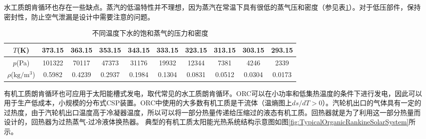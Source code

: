水工质朗肯循环也存在一些缺点。蒸汽的低温特性并不理想，因为蒸汽在常温下具有很低的蒸气压和密度（参见表\ref{tab:waterT_P_D}）。对于低压部件，保持密封性，防止空气泄漏是设计中需要注意的问题。
\begin{table}[htbp]
\setlength{\abovecaptionskip}{-10pt}
	\caption{不同温度下水的饱和蒸气的压力和密度}
	\begin{center}
	\begin{tabular}{cccccccccc}
		\toprule	
		    $T$(K)    &	373.15	    &    363.15    &    353.15    &    343.15    &    333.15    &    323.15    &    313.15    &    303.15    &    293.15\\
		\midrule	
		    $p$(Pa)    &    101322        &    70117    &    47373    &    31176    &    19932    &    12344    &    7381    &    4246    &    2339\\
		    $\rho$($\mathrm{kg/m^3}$)    &    0.5982        &    0.4239    &    0.2937    &    0.1984    &    0.1304    &    0.0831    &    0.0512    &    0.0304    &    0.0173\\
		\bottomrule
	\end{tabular}
	\end{center}
	\label{tab:waterT_P_D}
\end{table}

有机工质朗肯循环也可应用于太阳能槽式发电，取代常见的水工质朗肯循环。ORC可以在小功率和低集热温度的条件下进行发电，因此可以用于生产低成本，小规模的分布式CSP装置。ORC中使用的大多数有机工质是干流体（温熵图上$ds/dT > 0$）。汽轮机出口的气体具有一定的过热度，由于汽轮机出口温度高于冷凝器温度，所以可以将一部分热量传递给压缩过的液态有机工质。回热器就是为了利用这一部分热量而设计的，回热器为过热蒸气-过冷液体换热器。
典型的有机工质太阳能光热系统结构示意图如图\ref{fig:TypicalOrganicRankineSolarSystem}所示。

